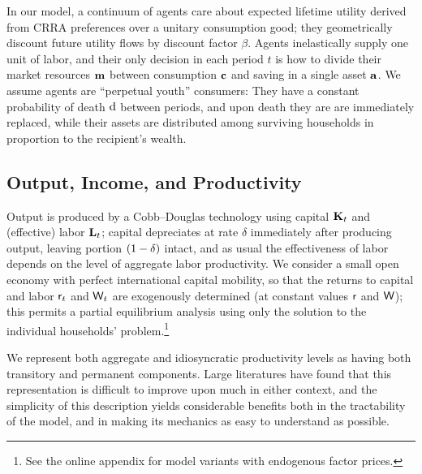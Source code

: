 In our model, a continuum of agents care about expected lifetime utility derived from CRRA preferences over a unitary consumption good; they geometrically discount future utility flows by discount factor $\beta$.  Agents inelastically supply one unit of labor, and their only decision in each period $t$ is how to divide their market resources $\mathbf{m}$ between consumption $\mathbf{c}$ and saving in a single asset $\mathbf{a}$.  We assume agents are \cite{blanchardFinite} ``perpetual youth'' consumers: They have a constant probability of death $\mathrm{d}$ between periods, and upon death they are are immediately replaced, while their assets are distributed among surviving households in proportion to the recipient's wealth.

\subsection{Output, Income, and Productivity}

Output is produced by a Cobb--Douglas technology using capital $\mathbf{K}_t$ and (effective) labor $\mathbf{L}_t$; capital depreciates at rate $\delta$ immediately after producing output, leaving portion $(1-\delta)$ intact, and as usual the effectiveness of labor depends on the level of aggregate labor productivity.  We consider a small open economy with perfect international capital mobility, so that the returns to capital and labor $\mathsf{r}_t$ and $\mathsf{W}_t$ are exogenously determined (at constant values $\mathsf{r}$ and $\mathsf{W}$); this permits a partial equilibrium analysis using only the solution to the individual households' problem.\footnote{See the online appendix for model variants with endogenous factor prices.}

We represent both aggregate and idiosyncratic productivity levels as having both transitory and permanent components.  Large literatures have found that this representation is difficult to improve upon much in either context, and the simplicity of this description yields considerable benefits both in the tractability of the model, and in making its mechanics as easy to understand as possible.

